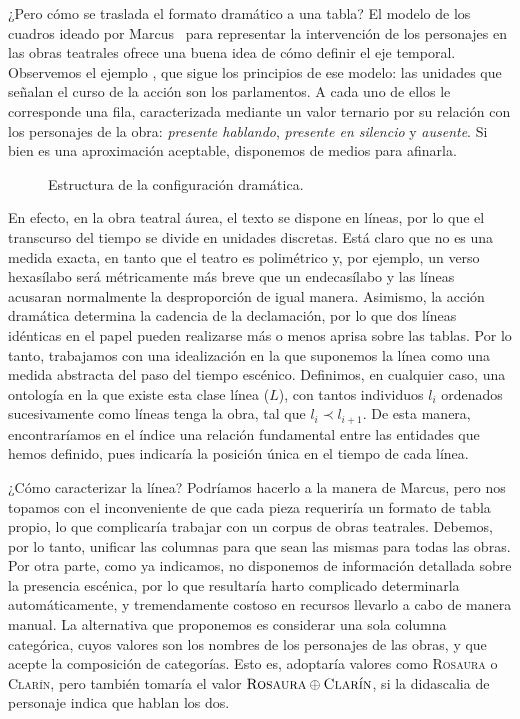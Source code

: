 ¿Pero cómo se traslada el formato dramático a una tabla? El modelo de los cuadros ideado por Marcus~\parencite*{marcus1973} para representar la intervención de los personajes en las obras teatrales ofrece una buena idea de cómo definir el eje temporal. Observemos el ejemplo  , que sigue los principios de ese modelo: las unidades que señalan el curso de la acción son los parlamentos. A cada uno de ellos le corresponde una fila, caracterizada mediante un valor ternario por su relación con los personajes de la obra: \textit{presente hablando}, \textit{presente en silencio} y \textit{ausente}. Si bien es una aproximación aceptable, disponemos de medios para afinarla.

\begin{figure}[!ht]
	\centering\small
	
	\caption{Estructura de la configuración dramática.}
	\label{fig:drama}
\end{figure}

En efecto, en la obra teatral áurea, el texto se dispone en líneas, por lo que el transcurso del tiempo se divide en unidades discretas. Está claro que no es una medida exacta, en tanto que el teatro es polimétrico y, por ejemplo, un verso hexasílabo será métricamente más breve que un endecasílabo y las líneas acusaran normalmente la desproporción de igual manera. Asimismo, la acción dramática determina la cadencia de la declamación, por lo que dos líneas idénticas en el papel pueden realizarse más o menos aprisa sobre las tablas. Por lo tanto, trabajamos con una idealización en la que suponemos la línea como una medida abstracta del paso del tiempo escénico. Definimos, en cualquier caso, una ontología en la que existe esta clase línea ($L$), con tantos individuos $l_i$ ordenados sucesivamente como líneas tenga la obra, tal que $l_i \prec l_{i+1}$. De esta manera, encontraríamos en el índice una relación fundamental entre las entidades que hemos definido, pues indicaría la posición única en el tiempo de cada línea. 

¿Cómo caracterizar la línea? Podríamos hacerlo a la manera de Marcus, pero nos topamos con el inconveniente de que cada pieza requeriría un formato de tabla propio, lo que complicaría trabajar con un corpus de obras teatrales. Debemos, por lo tanto, unificar las columnas para que sean las mismas para todas las obras. Por otra parte, como ya indicamos, no disponemos de información detallada sobre la presencia escénica, por lo que resultaría harto complicado determinarla automáticamente, y tremendamente costoso en recursos llevarlo a cabo de manera manual. La alternativa que proponemos es considerar una sola columna categórica, cuyos valores son los nombres de los personajes de las obras, y que acepte la composición de categorías. Esto es, adoptaría valores como \textsc{Rosaura} o \textsc{Clarín}, pero también tomaría el valor $\textsc{Rosaura} \oplus \textsc{Clarín}$, si la didascalia de personaje indica que hablan los dos.

